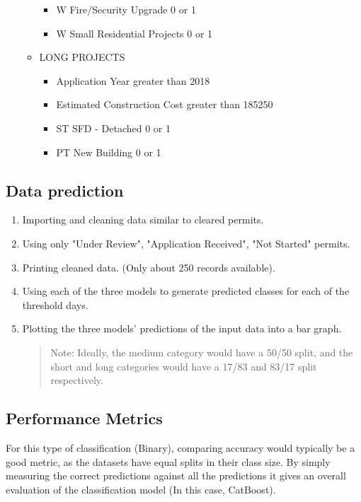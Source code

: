 \documentclass{article}
\begin{document}
\begin{enumerate}
\begin{itemize}
\begin{itemize}
            \item W Fire/Security Upgrade 0 or 1
            \item W Small Residential Projects 0 or 1
        \end{itemize}
        \item LONG PROJECTS
        \begin{itemize}
            \item Application Year greater than 2018
            \item Estimated Construction Cost greater than 185250
            \item ST SFD - Detached 0 or 1
            \item PT New Building 0 or 1
        \end{itemize}
    \end{itemize}
\end{enumerate}

\subsection{Data prediction}

\begin{enumerate}
    \item Importing and cleaning data similar to cleared permits.
    \item Using only "Under Review", "Application Received", "Not Started" permits.
    \item Printing cleaned data. (Only about 250 records available).
    \item Using each of the three models to generate predicted classes for each of the threshold days. 
    \item Plotting the three models' predictions of the input data into a bar graph. 
\begin{quote}
    Note: Ideally, the medium category would have a 50/50 split, and the short and long categories would have a 17/83 and 83/17 split respectively. 
\end{quote}
\end{enumerate}

\newpage
\subsection{Performance Metrics}

For this type of classification (Binary), comparing accuracy would typically be a good metric, as the datasets have equal splits in their class size. By simply measuring the correct predictions against all the predictions it gives an overall evaluation of the classification model (In this case, CatBoost). 
\end{document}
